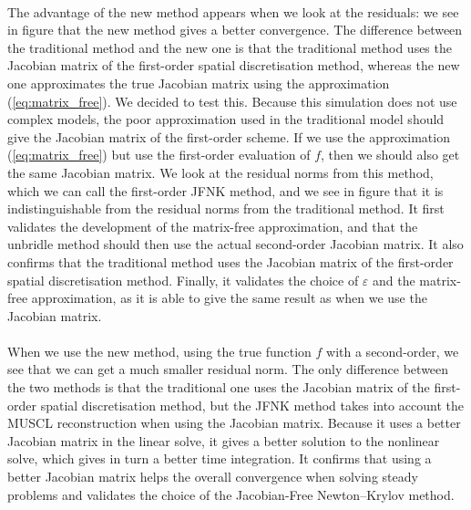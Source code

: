         \paragraph{}
        The advantage of the new method appears when we look at the residuals: we see in figure  that the new method gives a better convergence.
        The difference between the traditional method and the new one is that the traditional method uses the Jacobian matrix of the first-order spatial discretisation method, whereas the new one approximates the true Jacobian matrix using the approximation (\ref{eq:matrix_free}).
        We decided to test this.
        Because this simulation does not use complex models, the poor approximation used in the traditional model should give the Jacobian matrix of the first-order scheme.
        If we use the approximation (\ref{eq:matrix_free}) but use the first-order evaluation of $f$, then we should also get the same Jacobian matrix.
        We look at the residual norms from this method, which we can call the first-order JFNK method, and we see in figure  that it is indistinguishable from the residual norms from the traditional method.
        It first validates the development of the matrix-free approximation, and that the unbridle method should then use the actual second-order Jacobian matrix.
        It also confirms that the traditional method uses the Jacobian matrix of the first-order spatial discretisation method.
        Finally, it validates the choice of $\varepsilon$ and the matrix-free approximation, as it is able to give the same result as when we use the Jacobian matrix.

        \paragraph{}
        When we use the new method, using the true function $f$ with a second-order, we see that we can get a much smaller residual norm.
        The only difference between the two methods is that the traditional one uses the Jacobian matrix of the first-order spatial discretisation method, but the JFNK method takes into account the MUSCL reconstruction when using the Jacobian matrix.
        Because it uses a better Jacobian matrix in the linear solve, it gives a better solution to the nonlinear solve, which gives in turn a better time integration.
        It confirms that using a better Jacobian matrix helps the overall convergence when solving steady problems and validates the choice of the Jacobian-Free Newton--Krylov method.


